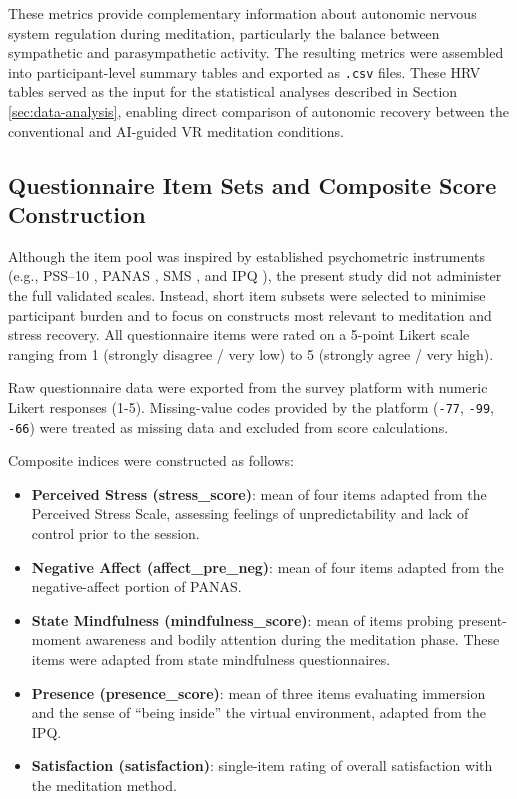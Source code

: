 These metrics provide complementary information about autonomic nervous system regulation during meditation, particularly the balance between sympathetic and parasympathetic activity.
The resulting metrics were assembled into participant-level summary tables and exported as \texttt{.csv} files. These HRV tables served as the input for the statistical analyses described in Section \ref{sec:data-analysis}, enabling
direct comparison of autonomic recovery between the conventional and AI-guided VR meditation conditions.

\subsection{Questionnaire Item Sets and Composite Score Construction}

Although the item pool was inspired by established psychometric instruments 
(e.g., PSS--10 \cite{cohen1983pss}, PANAS \cite{watson1988panas}, SMS 
\cite{tanay2013sms}, and IPQ \cite{schubert2001ipq}), the present study did not 
administer the full validated scales. Instead, short item subsets were selected 
to minimise participant burden and to focus on constructs most relevant to meditation and stress recovery. All questionnaire items were rated on a 5-point Likert scale 
ranging from 1 (strongly disagree / very low) to 5 (strongly agree / very high).


Raw questionnaire data were exported from the survey platform with numeric 
Likert responses (1-5). Missing-value codes provided by the platform 
(\texttt{-77}, \texttt{-99}, \texttt{-66}) were treated as missing data 
and excluded from score calculations.

Composite indices were constructed as follows:

\begin{itemize}
    \item \textbf{Perceived Stress (stress\_score)}: mean of four items adapted 
    from the Perceived Stress Scale, assessing feelings of unpredictability and 
    lack of control prior to the session.

    \item \textbf{Negative Affect (affect\_pre\_neg)}: mean of four items adapted 
    from the negative-affect portion of PANAS.

    \item \textbf{State Mindfulness (mindfulness\_score)}: mean of items probing 
    present-moment awareness and bodily attention during the meditation phase. 
    These items were adapted from state mindfulness questionnaires.

    \item \textbf{Presence (presence\_score)}: mean of three items evaluating 
    immersion and the sense of ``being inside'' the virtual environment, 
    adapted from the IPQ.

    \item \textbf{Satisfaction (satisfaction)}: single-item rating of overall 
    satisfaction with the meditation method.
\end{itemize}

